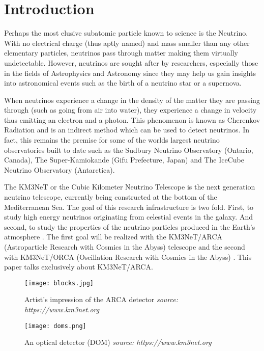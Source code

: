 
\chapter{Introduction}
\label{cha:intro}

Perhaps the most elusive subatomic particle known to science is the
Neutrino. With no electrical charge (thus aptly named) and mass
smaller than any other elementary particles, neutrinos pass through
matter making them virtually undetectable. However, neutrinos are
sought after by researchers, especially those in the fields of
Astrophysics and Astronomy since they may help us gain insights into
astronomical events such as the birth of a neutrino star or a
supernova.

When neutrinos experience a change in the density of the matter they
are passing through (such as going from air into water), they
experience a change in velocity thus emitting an electron and a
photon. This phenomenon is known as Cherenkov Radiation
\cite{margiotta2014km3net} and is an indirect method which can be used
to detect neutrinos. In fact, this remains the premise for some of the
worlds largest neutrino observatories built to date such as the
Sudbury Neutrino Observatory (Ontario, Canada), The Super-Kamiokande
(Gifu Prefecture, Japan) and The IceCube Neutrino Observatory
(Antarctica).

The KM3NeT or the Cubic Kilometer Neutrino Telescope is the next
generation neutrino telescope, currently being constructed at the
bottom of the Mediterranean Sea. The goal of this research
infrastructure is two fold. First, to study high energy neutrinos
originating from celestial events in the galaxy. And second, to study
the properties of the neutrino particles produced in the Earth's
atmosphere \cite{adrian2016letter}. The first goal will be realized
with the KM3NeT/ARCA (Astroparticle Research with Cosmics in the
Abyss) telescope and the second with KM3NeT/ORCA (Oscillation Research
with Cosmics in the Abyss) \cite{adrian2016letter}. This paper talks
exclusively about KM3NeT/ARCA.

\begin{figure}[htb]
  \centering
  \begin{minipage}{0.74\textwidth}
    \texttt{[image: blocks.jpg]}
    \caption{Artist's impression of the ARCA detector \textit{source: https://www.km3net.org}}%
    \label{fig:blocks}    
  \end{minipage}
  \begin{minipage}{0.24\textwidth}
    \texttt{[image: doms.png]}
    \caption{An optical detector (DOM) \textit{source: https://www.km3net.org}}%
    \label{fig:doms}    
  \end{minipage}
\end{figure}

